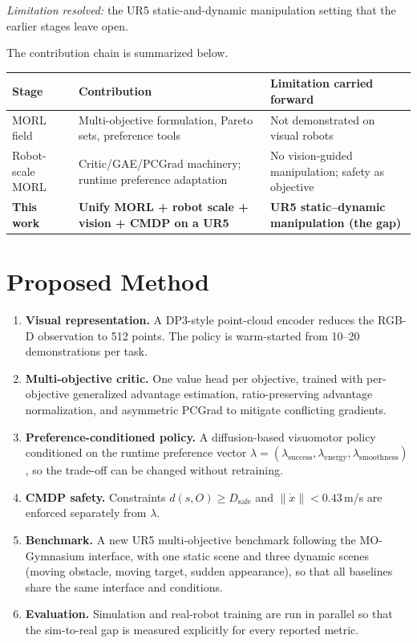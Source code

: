 \documentclass[11pt,a4paper]{article}
\begin{document}
\emph{Limitation resolved:} the UR5 static-and-dynamic manipulation
setting that the earlier stages leave open.

The contribution chain is summarized below.

\renewcommand{\arraystretch}{1.3}
\begin{tabularx}{\linewidth}{@{}>{\raggedright\arraybackslash}X
>{\raggedright\arraybackslash}X >{\raggedright\arraybackslash}X@{}}
\toprule
\textbf{Stage} & \textbf{Contribution} &
\textbf{Limitation carried forward} \\
\midrule
MORL field & Multi-objective formulation, Pareto sets, preference tools
& Not demonstrated on visual robots \\
Robot-scale MORL & Critic/GAE/PCGrad machinery; runtime preference
adaptation & No vision-guided manipulation; safety as objective \\
\textbf{This work} & \textbf{Unify MORL + robot scale + vision + CMDP on
a UR5} & \textbf{UR5 static--dynamic manipulation (the gap)} \\
\bottomrule
\end{tabularx}

\section{Proposed Method}

\begin{enumerate}
  \item \textbf{Visual representation.} A DP3-style point-cloud encoder
  reduces the RGB-D observation to 512 points. The policy is warm-started
  from 10--20 demonstrations per task.
  \item \textbf{Multi-objective critic.} One value head per objective,
  trained with per-objective generalized advantage estimation,
  ratio-preserving advantage normalization, and asymmetric PCGrad to
  mitigate conflicting gradients.
  \item \textbf{Preference-conditioned policy.} A diffusion-based
  visuomotor policy conditioned on the runtime preference vector
  $\lambda=(\lambda_{\mathrm{success}},\lambda_{\mathrm{energy}},
  \lambda_{\mathrm{smoothness}})$, so the trade-off can be changed
  without retraining.
  \item \textbf{CMDP safety.} Constraints $d(s,O)\geq D_{\mathrm{safe}}$
  and $\|\dot{x}\|<0.43$\,m/s are enforced separately from
  $\lambda$.
  \item \textbf{Benchmark.} A new UR5 multi-objective benchmark following
  the MO-Gymnasium interface, with one static scene and three dynamic
  scenes (moving obstacle, moving target, sudden appearance), so that all
  baselines share the same interface and conditions.
  \item \textbf{Evaluation.} Simulation and real-robot training are run
  in parallel so that the sim-to-real gap is measured explicitly for every
  reported metric.
\end{enumerate}
\end{document}
